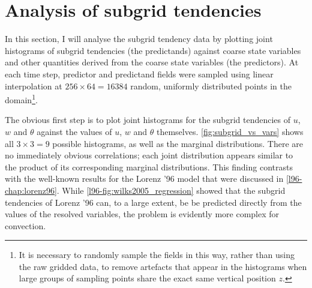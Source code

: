 \documentclass[../main.tex]{subfiles}
\begin{document}
\section{Analysis of subgrid tendencies}
In this section, I will analyse the subgrid tendency data by plotting joint
histograms of subgrid tendencies (the predictands) against coarse state
variables and other quantities derived from the coarse state variables (the
predictors). At each time step, predictor and predictand fields were sampled
using linear interpolation at $256 \times 64 = 16384$ random, uniformly
distributed points in the domain\footnote{It is necessary to randomly sample
the fields in this way, rather than using the raw gridded data, to remove
artefacts that appear in the histograms when large groups of sampling points
share the exact same vertical position $z$.}.

The obvious first step is to plot joint histograms for the subgrid tendencies
of $u$, $w$ and $\theta$ against the values of $u$, $w$ and $\theta$
themselves. \cref{fig:subgrid_vs_vars} shows all $3 \times 3 = 9$ possible
histograms, as well as the marginal distributions. There are no immediately
obvious correlations; each joint distribution appears similar to the product of
its corresponding marginal distributions. This finding contrasts with the
well-known results for the Lorenz '96 model that were discussed in
\cref{l96-chap:lorenz96}. While \cref{l96-fig:wilks2005_regression} showed that
the subgrid tendencies of Lorenz '96 can, to a large extent, be be predicted
directly from the values of the resolved variables, the problem is evidently
more complex for \rb{} convection.
\end{document}
